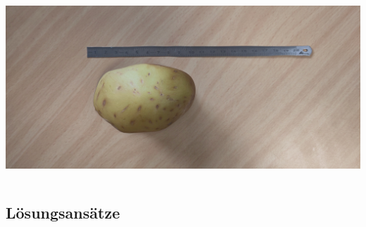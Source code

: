 \documentclass[11pt,t,usepdftitle=false,aspectratio=169]{beamer}
\begin{document}
\begin{frame}
\begin{columns}[T]
\begin{column}{0.38\textwidth}
			\includegraphics[width=\textwidth]{images/image_2_s.jpg}
		\end{column}
	\end{columns}
\end{frame}

\subsection{Lösungsansätze}
\end{document}
